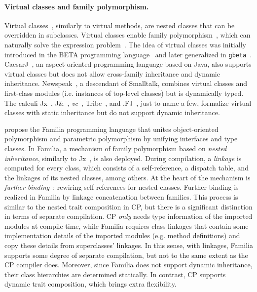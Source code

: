 \paragraph{Virtual classes and family polymorphism.}
Virtual classes~\citep{madsen1989virtual}, similarly to virtual methods, are
nested classes that can be overridden in subclasses. Virtual classes enable
family polymorphism~\citep{ernst2001family}, which can naturally solve the
expression problem~\citep{ernst2004expression}. The idea of virtual classes was
initially introduced in the BETA programming language~\citep{madsen1993object}
and later generalized in \texttt{gbeta}~\citep{ernst2000gbeta}.
CaesarJ~\citep{aracic2006overview}, an aspect-oriented programming language
based on Java, also supports virtual classes but does not allow cross-family
inheritance and dynamic inheritance. Newspeak~\citep{bracha2010modules}, a
descendant of Smalltalk, combines virtual classes and first-class modules (i.e.
instances of top-level classes) but is dynamically typed. The calculi
Jx~\citep{nystrom2004scalable}, J\&~\citep{nystrom2006j},
\emph{vc}~\citep{ernst2006virtual}, Tribe~\citep{clarke2007tribe}, and
.FJ~\citep{saito2008lightweight}, just to name a few, formalize virtual classes
with static inheritance but do not support dynamic inheritance.

\citet{zhang2017familia} propose the Familia programming language that unites
object-oriented polymorphism and parametric polymorphism by unifying interfaces
and type classes. In Familia, a mechanism of family polymorphism based on
\emph{nested inheritance}, similarly to Jx~\citep{nystrom2004scalable}, is also
deployed. During compilation, a \emph{linkage} is computed for every class,
which consists of a self-reference, a dispatch table, and the linkages of its
nested classes, among others. At the heart of the mechanism is \emph{further
binding}~\citep{madsen1993object}: rewiring self-references for nested classes.
Further binding is realized in Familia by linkage concatenation between
families. This process is similar to the nested trait composition in CP, but
there is a significant distinction in terms of separate compilation. CP
\emph{only} needs type information of the imported modules at compile time,
while Familia requires class linkages that contain some implementation details
of the imported modules (e.g. method definitions) and copy these details from
superclasses' linkages. In this sense, with linkages, Familia supports some
degree of separate compilation, but not to the same extent as the CP compiler
does. Moreover, since Familia does not support dynamic inheritance, their class
hierarchies are determined statically. In contrast, CP supports dynamic trait
composition, which brings extra flexibility.

